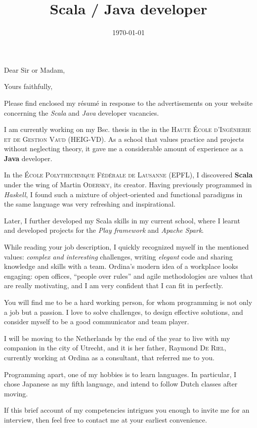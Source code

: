 \documentclass[10pt,a4paper,roman]{moderncv}
\title{Scala / Java developer}
\begin{document}
\date{\today}
\opening{Dear Sir or Madam,}
\closing{Yours faithfully,}

\makelettertitle

Please find enclosed my résumé in response to the advertisements on your website concerning the \textit{Scala} and \textit{Java} developer vacancies.

I am currently working on my Bsc. thesis in the in the \textsc{Haute École d'Ingénierie et de Gestion Vaud} (HEIG-VD). As a school that values practice and projects without neglecting theory, it gave me a considerable amount of experience as a \textbf{Java} developer.

In the \textsc{École Polythechnique Fédérale de Lausanne} (EPFL), I discovered \textbf{Scala} under the wing of Martin \textsc{Odersky}, its creator. Having previously programmed in \textit{Haskell}, I found such a mixture of object-oriented and functional paradigms in the same language was very refreshing and inspirational.

Later, I further developed my Scala skills in my current school, where I learnt and developed projects for the \textit{Play framework} and \textit{Apache Spark}.

While reading your job description, I quickly recognized myself in the mentioned values: \textit{complex and interesting} challenges, writing \textit{elegant} code and sharing knowledge and skills with a team. Ordina's modern idea of a workplace looks engaging: open offices, ``people over rules'' and agile methodologies are values that are really motivating, and I am very confident that I can fit in perfectly.

You will find me to be a hard working person, for whom programming is not only a job but a passion. I love to solve challenges, to design effective solutions, and consider myself to be a good communicator and team player.

I will be moving to the Netherlands by the end of the year to live with my companion in the city of Utrecht, and it is her father, Raymond \textsc{De Riel}, currently working at Ordina as a consultant, that referred me to you.

Programming apart, one of my hobbies is to learn languages. In particular, I chose Japanese as my fifth language, and intend to follow Dutch classes after moving.

If this brief account of my competencies intrigues you enough to invite me for an interview, then feel free to contact me at your earliest convenience. 

\makeletterclosing
\end{document}

